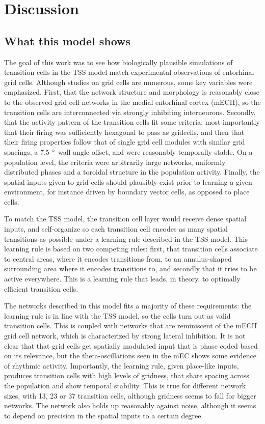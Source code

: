 \documentclass{article}
\begin{document}
    \section{Discussion}

    \subsection{What this model shows}
    The goal of this work was to see how biologically plausible simulations of transition cells in the TSS model match experimental observations of entorhinal grid cells. Although studies on grid cells are numerous, some key variables were emphasized. First, that the network structure and morphology is reasonably close to the observed grid cell networks in the medial entorhinal cortex (mECII), so the transition cells are interconnected via strongly inhibiting interneurons. Secondly, that the activity pattern of the transition cells fit some criteria: most importantly that their firing was sufficiently hexagonal to pass as gridcells, and then that their firing properties follow that of single grid cell modules with similar grid spacings, a 7.5 \(\degree\) wall-angle offset, and were reasonably temporally stable. On a population level, the criteria were arbitrarily large networks, uniformly distributed phases and a toroidal structure in the population activity. Finally, the spatial inputs given to grid cells should plausibly exist prior to learning a given environment, for instance driven by boundary vector cells, as opposed to place cells.

    To match the TSS model, the transition cell layer would receive dense spatial inputs, and self-organize so each transition cell encodes as many spatial transitions as possible under a learning rule described in the TSS-model. This learning rule is based on two competing rules: first, that transition cells associate to central areas, where it encodes transitions from, to an annulus-shaped surrounding area where it encodes transitions to, and secondly that it tries to be active everywhere. This is a learning rule that leads, in theory, to optimally efficient transition cells.

    The networks described in this model fits a majority of these requirements: the learning rule is in line with the TSS model, so the cells turn out as valid transition cells. This is coupled with networks that are reminiscent of the mECII grid cell network, which is characterized by strong lateral inhibition. It is not clear that that grid cells get spatially modulated input that is phase coded based on its relevance, but the theta-oscillations seen in the mEC shows some evidence of rhythmic activity. Importantly, the learning rule, given place-like inputs, produces transition cells with high levels of gridness, that share spacing across the population and show temporal stability. This is true for different network sizes, with 13, 23 or 37 transition cells, although gridness seems to fall for bigger networks. The network also holds up reasonably against noise, although it seems to depend on precision in the spatial inputs to a certain degree.
    
\end{document}

